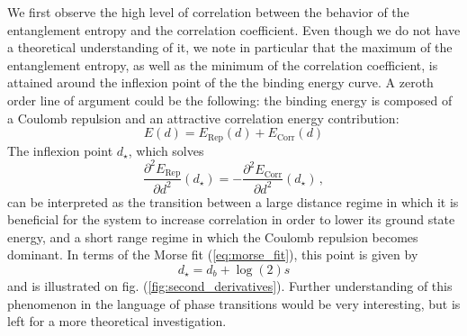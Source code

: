 \documentclass[reprint, amsmath, amssymb, floatfix, aps, pra]{revtex4-2}
\begin{document}
    We first observe the high level of correlation between the behavior of the entanglement entropy and the correlation coefficient. Even though we do not have a theoretical understanding of it, we note in particular that the maximum of the entanglement entropy, as well as the minimum of the correlation coefficient, is attained around the inflexion point of the the binding energy curve. A zeroth order line of argument could be the following: the binding energy is composed of a Coulomb repulsion and an attractive correlation energy contribution:
    \begin{equation}
        E(d)=E_\text{Rep}(d)+E_\text{Corr}(d)
    \end{equation}
    The inflexion point $d_\star$, which solves
    \begin{equation*}
        \frac{\partial^2 E_\text{Rep}}{\partial d^2}(d_\star) = -\frac{\partial^2 E_\text{Corr}}{\partial d^2}(d_\star)\,,
    \end{equation*}
    can be interpreted as the transition between a large distance regime in which it is beneficial for the system to increase correlation in order to lower its ground state energy, and a short range regime in which the Coulomb repulsion becomes dominant. In terms of the Morse fit (\ref{eq:morse_fit}), this point is given by
    \begin{equation*}
        d_\star = d_b + \log(2)s
    \end{equation*}
    and is illustrated on fig. (\ref{fig:second_derivatives}). Further understanding of this phenomenon in the language of phase transitions would be very interesting, but is left for a more theoretical investigation.
\end{document}
